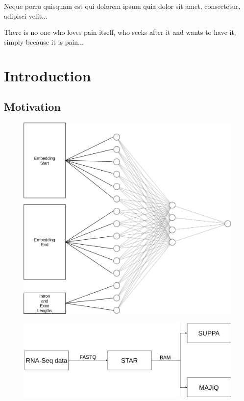\begin{savequote}[8cm]
\textlatin{Neque porro quisquam est qui dolorem ipsum quia dolor sit amet, consectetur, adipisci velit...}

There is no one who loves pain itself, who seeks after it and wants to have it, simply because it is pain...
\end{savequote}

\chapter{\label{ch:1-intro}Introduction} 

\minitoc

\section{Motivation}


\begin{figure}
        \includegraphics[width=1.\textwidth]{figures/d2v.png}
\end{figure}


\begin{figure}
	\includegraphics[width=1.\textwidth]{figures/data_processing_flowchart.png}
\end{figure}

